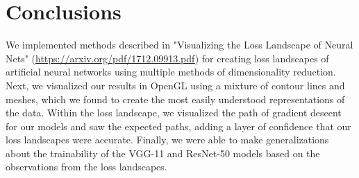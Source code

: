 \documentclass{acmsiggraph}
\begin{document}
\section{Conclusions}
We implemented methods described in "Visualizing the Loss Landscape of Neural Nets" (\url{https://arxiv.org/pdf/1712.09913.pdf}) for creating loss landscapes of artificial neural networks using multiple methods of dimensionality reduction. Next, we visualized our results in OpenGL using a mixture of contour lines and meshes, which we found to create the most easily understood representations of the data. Within the loss landscape, we visualized the path of gradient descent for our models and saw the expected paths, adding a layer of confidence that our loss landscapes were accurate. Finally, we were able to make generalizations about the trainability of the VGG-11 and ResNet-50 models based on the observations from the loss landscapes.


\nocite{*}

\end{document}
